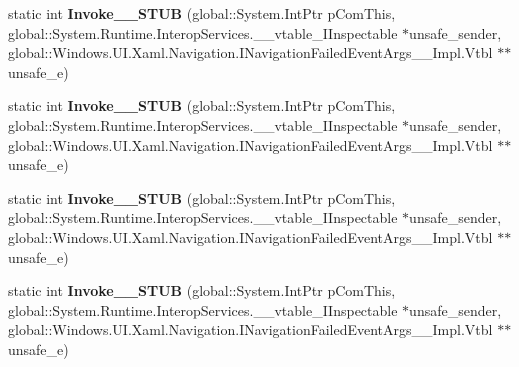 \begin{DoxyCompactItemize}
\item 
\mbox{\label{struct_windows_1_1_u_i_1_1_xaml_1_1_navigation_1_1_navigation_failed_event_handler_____impl_1_1_vtbl_ad8b067dfb29168d1adf9353c44b2483f}} 
static int {\bfseries Invoke\+\_\+\+\_\+\+S\+T\+UB} (global\+::\+System.\+Int\+Ptr p\+Com\+This, global\+::\+System.\+Runtime.\+Interop\+Services.\+\_\+\+\_\+vtable\+\_\+\+I\+Inspectable $\ast$unsafe\+\_\+sender, global\+::\+Windows.\+U\+I.\+Xaml.\+Navigation.\+I\+Navigation\+Failed\+Event\+Args\+\_\+\+\_\+\+Impl.\+Vtbl $\ast$$\ast$unsafe\+\_\+e)
\item 
\mbox{\label{struct_windows_1_1_u_i_1_1_xaml_1_1_navigation_1_1_navigation_failed_event_handler_____impl_1_1_vtbl_ad8b067dfb29168d1adf9353c44b2483f}} 
static int {\bfseries Invoke\+\_\+\+\_\+\+S\+T\+UB} (global\+::\+System.\+Int\+Ptr p\+Com\+This, global\+::\+System.\+Runtime.\+Interop\+Services.\+\_\+\+\_\+vtable\+\_\+\+I\+Inspectable $\ast$unsafe\+\_\+sender, global\+::\+Windows.\+U\+I.\+Xaml.\+Navigation.\+I\+Navigation\+Failed\+Event\+Args\+\_\+\+\_\+\+Impl.\+Vtbl $\ast$$\ast$unsafe\+\_\+e)
\item 
\mbox{\label{struct_windows_1_1_u_i_1_1_xaml_1_1_navigation_1_1_navigation_failed_event_handler_____impl_1_1_vtbl_ad8b067dfb29168d1adf9353c44b2483f}} 
static int {\bfseries Invoke\+\_\+\+\_\+\+S\+T\+UB} (global\+::\+System.\+Int\+Ptr p\+Com\+This, global\+::\+System.\+Runtime.\+Interop\+Services.\+\_\+\+\_\+vtable\+\_\+\+I\+Inspectable $\ast$unsafe\+\_\+sender, global\+::\+Windows.\+U\+I.\+Xaml.\+Navigation.\+I\+Navigation\+Failed\+Event\+Args\+\_\+\+\_\+\+Impl.\+Vtbl $\ast$$\ast$unsafe\+\_\+e)
\item 
\mbox{\label{struct_windows_1_1_u_i_1_1_xaml_1_1_navigation_1_1_navigation_failed_event_handler_____impl_1_1_vtbl_ad8b067dfb29168d1adf9353c44b2483f}} 
static int {\bfseries Invoke\+\_\+\+\_\+\+S\+T\+UB} (global\+::\+System.\+Int\+Ptr p\+Com\+This, global\+::\+System.\+Runtime.\+Interop\+Services.\+\_\+\+\_\+vtable\+\_\+\+I\+Inspectable $\ast$unsafe\+\_\+sender, global\+::\+Windows.\+U\+I.\+Xaml.\+Navigation.\+I\+Navigation\+Failed\+Event\+Args\+\_\+\+\_\+\+Impl.\+Vtbl $\ast$$\ast$unsafe\+\_\+e)

\end{DoxyCompactItemize}

